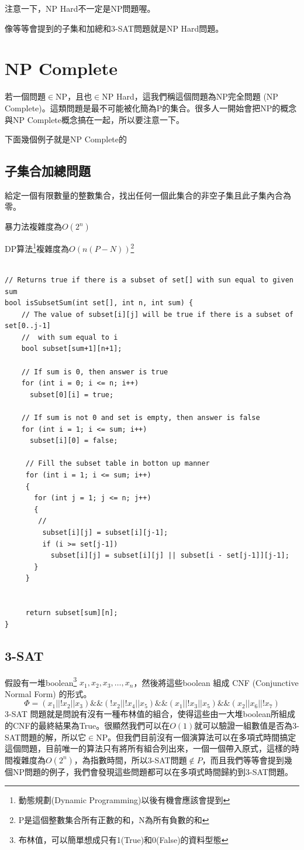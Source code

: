 \documentclass{article}
\begin{document}
注意一下，NP Hard不一定是NP問題喔。

像等等會提到的子集和加總和3-SAT問題就是NP Hard問題。

\section{NP Complete}
若一個問題$\in$NP，且也$\in$NP Hard，這我們稱這個問題為NP完全問題 (NP Complete)。這類問題是最不可能被化簡為P的集合。很多人一開始會把NP的概念與NP Complete概念搞在一起，所以要注意一下。

下面幾個例子就是NP Complete的
\subsection{子集合加總問題}
給定一個有限數量的整數集合，找出任何一個此集合的非空子集且此子集內合為零。

暴力法複雜度為$O(2^n)$

DP算法\footnote{動態規劃(Dynamic Programming)以後有機會應該會提到}複雜度為$O(n(P-N))$\footnote{P是這個整數集合所有正數的和，N為所有負數的和}

\begin{verbatim}

// Returns true if there is a subset of set[] with sun equal to given sum
bool isSubsetSum(int set[], int n, int sum) {
    // The value of subset[i][j] will be true if there is a subset of set[0..j-1]
    //  with sum equal to i
    bool subset[sum+1][n+1];
 
    // If sum is 0, then answer is true
    for (int i = 0; i <= n; i++)
      subset[0][i] = true;
 
    // If sum is not 0 and set is empty, then answer is false
    for (int i = 1; i <= sum; i++)
      subset[i][0] = false;
 
     // Fill the subset table in botton up manner
     for (int i = 1; i <= sum; i++)
     {
       for (int j = 1; j <= n; j++)
       {
        //
         subset[i][j] = subset[i][j-1];
         if (i >= set[j-1])
           subset[i][j] = subset[i][j] || subset[i - set[j-1]][j-1];
       }
     }
 
 
     return subset[sum][n];
}
\end{verbatim}

\subsection{3-SAT}
假設有一堆boolean\footnote{布林值，可以簡單想成只有1(True)和0(False)的資料型態} $x_1, x_2, x_3, \ldots, x_n$，然後將這些boolean 組成 CNF (Conjunctive Normal Form) 的形式。
\begin{equation}
\Phi = (x_1 || !x_2 || x_3) \&\& (!x_2 || !x_4 || x_5) \&\& (x_1 || !x_3 || x_5) \&\& (x_2 || x_6 || !x_7)
\end{equation}
3-SAT 問題就是問說有沒有一種布林值的組合，使得這些由一大堆boolean所組成的CNF的最終結果為True。很顯然我們可以在$O(1)$就可以驗證一組數值是否為3-SAT問題的解，所以它$\in$NP。但我們目前沒有一個演算法可以在多項式時間搞定這個問題，目前唯一的算法只有將所有組合列出來，一個一個帶入原式，這樣的時間複雜度為$O(2^n)$，為指數時間，所以3-SAT問題$\not\in P$，而且我們等等會提到幾個NP問題的例子，我們會發現這些問題都可以在多項式時間歸約到3-SAT問題。
\end{document}
